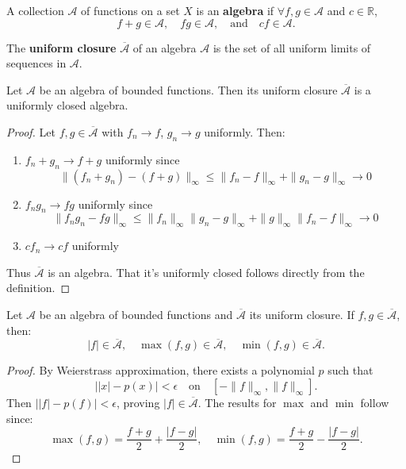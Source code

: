 \documentclass{functionspaces}
\begin{document}
\begin{definition}[Algebra]
A collection $\mathcal{A}$ of functions on a set $X$ is an \textbf{algebra} if $\forall f,g \in \mathcal{A}$ and $c \in \mathbb{R}$,
\[
f+g \in \mathcal{A}, \quad fg \in \mathcal{A}, \quad \text{and} \quad cf \in \mathcal{A}.
\]
\end{definition}

\begin{definition}
The \textbf{uniform closure} $\overline{\mathcal{A}}$ of an algebra $\mathcal{A}$ is the set of all uniform limits of sequences in $\mathcal{A}$.
\end{definition}

\begin{theorem}
Let $\mathcal{A}$ be an algebra of bounded functions. Then its uniform closure $\overline{\mathcal{A}}$ is a uniformly closed algebra.
\end{theorem}

\begin{proof}
Let $f,g \in \overline{\mathcal{A}}$ with $f_n \to f$, $g_n \to g$ uniformly. Then:
\begin{enumerate}
\item $f_n + g_n \to f + g$ uniformly since
\[
\|(f_n+g_n)-(f+g)\|_\infty \leq \|f_n-f\|_\infty + \|g_n-g\|_\infty \to 0
\]
\item $f_ng_n \to fg$ uniformly since
\[
\|f_ng_n-fg\|_\infty \leq \|f_n\|_\infty\|g_n-g\|_\infty + \|g\|_\infty\|f_n-f\|_\infty \to 0
\]
\item $cf_n \to cf$ uniformly
\end{enumerate}
Thus $\overline{\mathcal{A}}$ is an algebra. That it's uniformly closed follows directly from the definition.
\end{proof}

\begin{proposition}
Let $\mathcal{A}$ be an algebra of bounded functions and $\overline{\mathcal{A}}$ its uniform closure. If $f,g \in \overline{\mathcal{A}}$, then:
\[
|f| \in \overline{\mathcal{A}}, \quad \max(f,g) \in \overline{\mathcal{A}}, \quad \min(f,g) \in \overline{\mathcal{A}}.
\]
\end{proposition}

\begin{proof}
By Weierstrass approximation, there exists a polynomial $p$ such that
\[
\big| |x| - p(x) \big| < \epsilon \quad \text{on} \quad [-\|f\|_\infty, \|f\|_\infty].
\]
Then $\big| |f| - p(f) \big| < \epsilon$, proving $|f| \in \overline{\mathcal{A}}$. The results for $\max$ and $\min$ follow since:
\[
\max(f,g) = \frac{f+g}{2} + \frac{|f-g|}{2}, \quad \min(f,g) = \frac{f+g}{2} - \frac{|f-g|}{2}.
\]
\end{proof}
\end{document}
